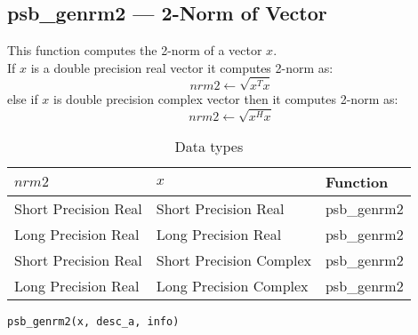 %
%


\clearpage\subsection*{psb\_genrm2 --- 2-Norm of Vector}    

This function computes the 2-norm of a vector $x$.\\
If $x$ is a double precision real  vector
it computes 2-norm as:
\[ nrm2 \leftarrow \sqrt{x^T x}\]
else if $x$ is double precision complex vector then it computes 2-norm  as:
\[ nrm2 \leftarrow \sqrt{x^H x}\]

\begin{table}[h]
\begin{center}
\begin{tabular}{lll}
\hline
$nrm2$ & $x$ & {\bf Function}\\
\hline
Short Precision Real&Short Precision Real & psb\_genrm2 \\
Long Precision Real&Long Precision Real & psb\_genrm2 \\
Short Precision Real&Short Precision Complex & psb\_genrm2 \\
Long Precision Real&Long Precision Complex & psb\_genrm2 \\
\hline
\end{tabular}
\end{center}
\caption{Data types\label{tab:f90nrm2}}
\end{table}

\begin{verbatim}
psb_genrm2(x, desc_a, info)
\end{verbatim}

